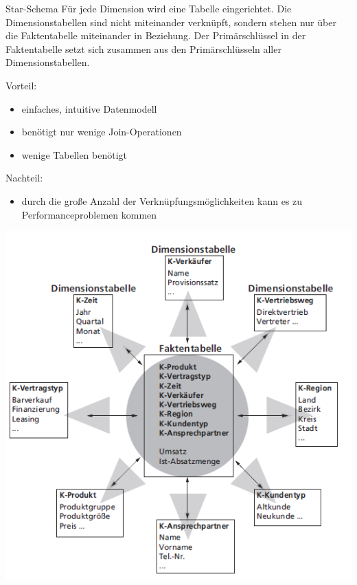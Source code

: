 \documentclass[a6paper,10pt,grid=front%
,toc
]{kartei}
\begin{document}
  \begin{karte}{Star-Schema}  
    Für jede Dimension wird eine Tabelle eingerichtet. Die Dimensionstabellen sind nicht miteinander verknüpft, sondern stehen nur über die Faktentabelle miteinander in Beziehung. Der Primärschlüssel in der Faktentabelle setzt sich zusammen aus den Primärschlüsseln aller Dimensionstabellen.

    Vorteil:
    \begin{itemize}
      \item einfaches, intuitive Datenmodell
      \item benötigt nur wenige Join-Operationen
      \item wenige Tabellen benötigt
    \end{itemize}

    Nachteil:
    \begin{itemize}
      \item durch die große Anzahl der Verknüpfungsmöglichkeiten
kann es zu Performanceproblemen kommen
    \end{itemize}
    \includegraphics[height=0.45\paperheight]{img/star_schema}
  \end{karte}
\end{document}
